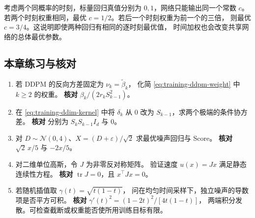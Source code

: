 \begin{example}[相同逐时刻目标在共享参数下的差异]
考虑两个同概率的时刻，标量回归真值分别为 \(0,1\)，网络只能输出同一个常数 \(c\)。
若两个时刻权重相同，最优 \(c=1/2\)。若后一个时刻权重为前一个的三倍，
则最优 \(c=3/4\)。这说明即使两种回归有相同的逐时刻最优值，
时间加权也会改变共享网络的总体最优参数。
\end{example}

\subsection*{本章练习与核对}

\begin{enumerate}[leftmargin=2em]
  \item 若 DDPM 的反向方差固定为 \(\nu_k=\widetilde\beta_k\)，
        化简 \eqref{eq:training-ddpm-weight} 中 \(k\ge2\) 的权重。
        \textbf{核对} \(\beta_k/(2r_k S_{k-1}^2)\)。
  \item 在 \eqref{eq:training-ddim-kernel} 中将 \(\delta_k\) 从 \(0\)
        改为 \(S_{k-1}\)，求两个极端的条件协方差。
        \textbf{核对} 分别为 \(S_k S_{k-1}I_d\) 与 \(0\)。
  \item 对 \(D\sim\mathcal N(0,4)\)、\(X=(D+\varepsilon)/\sqrt 2\)
        求最优噪声回归与 Score。
        \textbf{核对} \(\sqrt 2\,x/5\) 与 \(-2x/5\)。
  \item 对二维单位高斯，令 \(J\) 为非零反对称矩阵。
        验证速度 \(u(x)=Jx\) 满足静态连续性方程。
        \textbf{核对} \(\operatorname{tr}J=0\)，且 \(x^\top Jx=0\)。
  \item 若随机插值取 \(\gamma(t)=\sqrt{t(1-t)}\)，
        问在均匀时间采样下，独立噪声的导数项是否平方可积。
        \textbf{核对} \(\gamma'(t)^2=(1-2t)^2/[4t(1-t)]\)，
        两端积分发散。可检查截断或权重能否使所用训练目标有限。
\end{enumerate}
